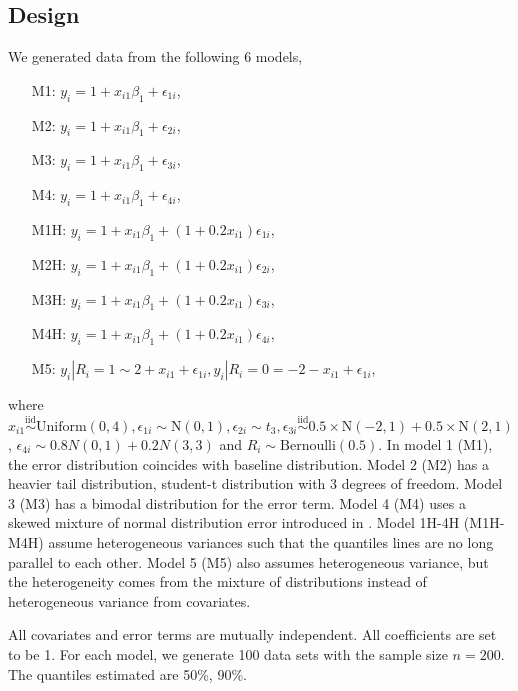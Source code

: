 \documentclass[12pt]{article}
\begin{document}
\subsection{Design}
We generated data from the following 6 models,
\begin{itemize}
\item [M1:] $y_i = 1 + x_{i1}\beta_1 + \epsilon_{1i}$,
\item [M2:] $y_i = 1 + x_{i1}\beta_1 + \epsilon_{2i}$,
\item [M3:] $y_i = 1 + x_{i1}\beta_1 + \epsilon_{3i}$,
\item [M4:] $y_i = 1 + x_{i1}\beta_1 + \epsilon_{4i}$,
\item [M1H:] $y_i = 1 + x_{i1}\beta_1 + (1 + 0.2x_{i1})
  \epsilon_{1i}$,
\item [M2H:] $y_i = 1 + x_{i1}\beta_1 + (1 + 0.2x_{i1})
  \epsilon_{2i}$,
\item [M3H:] $y_i = 1 + x_{i1}\beta_1 + (1 + 0.2x_{i1})
  \epsilon_{3i}$,
\item [M4H:] $y_i = 1 + x_{i1}\beta_1 + (1 + 0.2x_{i1})
  \epsilon_{4i}$,
\item [M5:] $y_{i} | R_i = 1 \sim 2 + x_{i1} + \epsilon_{1i}, y_{i}|
  R_i = 0 = -2 - x_{i1} + \epsilon_{1i}$,
\end{itemize}
where $x_{i1} \stackrel{\mbox{iid}}{\sim} \mathrm{Uniform}(0,4),
\epsilon_{1i} \sim \mathrm{N}(0,1), \epsilon_{2i} \sim t_3,
\epsilon_{3i} \stackrel{\mbox{iid}}{\sim} 0.5 \times \mathrm{N}(-2,1)
+ 0.5 \times \mathrm{N}(2,1)$, $\epsilon_{4i} \sim 0.8 N(0,1) + 0.2
N(3,3)$ and $R_i \sim \mbox{Bernoulli}(0.5)$. In model 1 (M1), the
error distribution coincides with baseline distribution. Model 2 (M2)
has a heavier tail distribution, student-t distribution with 3 degrees
of freedom. Model 3 (M3) has a bimodal distribution for the error
term.  Model 4 (M4) uses a skewed mixture of normal distribution error
introduced in \citet{reich2010}. Model 1H-4H (M1H-M4H) assume
heterogeneous variances such that the quantiles lines are no long
parallel to each other. Model 5 (M5) also assumes heterogeneous variance,
but the heterogeneity comes from the mixture of distributions
instead of heterogeneous variance from covariates.

All covariates and error terms are mutually independent. All
coefficients are set to be 1. For each model, we generate 100 data
sets with the sample size $n=200$. The quantiles estimated are 50\%,
90\%.
\end{document}
